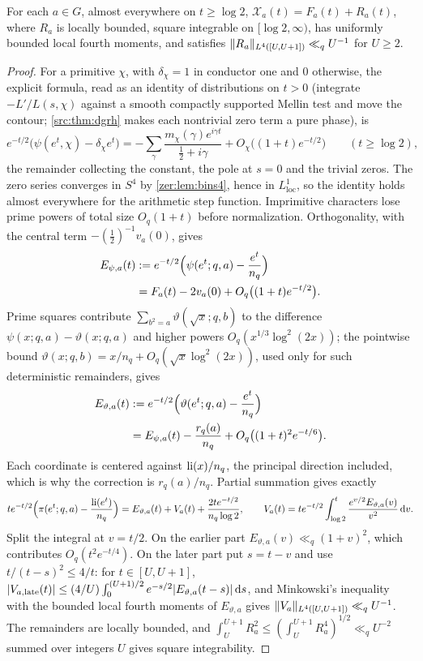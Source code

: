 \begin{lemma}\label{zer:lem:unsmoothed}
For each $a\in G$, almost everywhere on $t\ge\log2$, $\mathcal X_a(t)=F_a(t)+R_a(t)$, where $R_a$ is
locally bounded, square integrable on $[\log2,\infty)$, has uniformly bounded local fourth moments, and
satisfies $\lVert R_a\rVert_{L^4([U,U+1])}\ll_qU^{-1}$ for $U\ge2$.
\end{lemma}
\begin{proof}
For a primitive $\chi$, with $\delta_\chi=1$ in conductor one and $0$ otherwise, the explicit formula,
read as an identity of distributions on $t>0$ (integrate $-L'/L(s,\chi)$ against a smooth compactly
supported Mellin test and move the contour; \cref{src:thm:dgrh} makes each nontrivial zero term a
pure phase), is
\[
 e^{-t/2}\bigl(\psi(e^t,\chi)-\delta_\chi e^t\bigr)=-\sum_\gamma\frac{m_\chi(\gamma)e^{i\gamma t}}{\tfrac12+i\gamma}
 +O_\chi\bigl((1+t)e^{-t/2}\bigr)\qquad(t\ge\log2),
\]
the remainder collecting the constant, the pole at $s=0$ and the trivial zeros. The zero series
converges in $S^4$ by \cref{zer:lem:bins4}, hence in $L^1_{\mathrm{loc}}$, so the identity holds almost
everywhere for the arithmetic step function. Imprimitive characters lose prime powers of total size
$O_q(1+t)$ before normalization. Orthogonality, with the central term $-(\tfrac12)^{-1}v_a(0)$, gives
\[
 \begin{aligned}E_{\psi,a}(t)&:=e^{-t/2}\Bigl(\psi(e^t;q,a)-\frac{e^t}{n_q}\Bigr)\\
 &=F_a(t)-2v_a(0)+O_q\bigl((1+t)e^{-t/2}\bigr).\end{aligned}
\]
Prime squares contribute $\sum_{b^2=a}\vartheta(\sqrt x;q,b)$ to the difference
$\psi(x;q,a)-\vartheta(x;q,a)$ and higher powers $O_q(x^{1/3}\log^2(2x))$; the pointwise bound
$\vartheta(x;q,b)=x/n_q+O_q(\sqrt x\log^2(2x))$, used only for such deterministic remainders, gives
\[
 \begin{aligned}E_{\vartheta,a}(t)&:=e^{-t/2}\Bigl(\vartheta(e^t;q,a)-\frac{e^t}{n_q}\Bigr)\\
 &=E_{\psi,a}(t)-\frac{r_q(a)}{n_q}+O_q\bigl((1+t)^2e^{-t/6}\bigr).\end{aligned}
\]
Each coordinate is centered against $\operatorname{li}(x)/n_q$, the principal direction included, which is why the
correction is $r_q(a)/n_q$. Partial summation gives exactly
\[
 te^{-t/2}\Bigl(\pi(e^t;q,a)-\frac{\operatorname{li}(e^t)}{n_q}\Bigr)=E_{\vartheta,a}(t)+V_a(t)+\frac{2te^{-t/2}}{n_q\log2},\qquad
 V_a(t)=te^{-t/2}\int_{\log2}^t\frac{e^{v/2}E_{\vartheta,a}(v)}{v^2}\,\mathrm{d} v .
\]
Split the integral at $v=t/2$. On the earlier part $E_{\vartheta,a}(v)\ll_q(1+v)^2$, which contributes
$O_q(t^2e^{-t/4})$. On the later part put $s=t-v$ and use $t/(t-s)^2\le4/t$: for $t\in[U,U+1]$,
$\lvert V_{a,\mathrm{late}}(t)\rvert\le(4/U)\int_0^{(U+1)/2}e^{-s/2}\lvert E_{\vartheta,a}(t-s)\rvert\,\mathrm{d} s$, and
Minkowski's inequality with the bounded local fourth moments of $E_{\vartheta,a}$ gives
$\lVert V_a\rVert_{L^4([U,U+1])}\ll_qU^{-1}$. The remainders are locally bounded, and
$\int_U^{U+1}R_a^2\le(\int_U^{U+1}R_a^4)^{1/2}\ll_qU^{-2}$ summed over integers $U$ gives square
integrability.
\end{proof}


